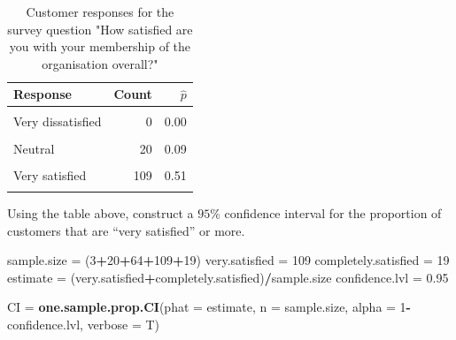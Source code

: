 \documentclass[
]{article}
\newenvironment{Shaded}{\begin{snugshade}}{\end{snugshade}}
\newcommand{\AttributeTok}[1]{\textcolor[rgb]{0.13,0.29,0.53}{#1}}
\newcommand{\DecValTok}[1]{\textcolor[rgb]{0.00,0.00,0.81}{#1}}
\newcommand{\FloatTok}[1]{\textcolor[rgb]{0.00,0.00,0.81}{#1}}
\newcommand{\FunctionTok}[1]{\textcolor[rgb]{0.13,0.29,0.53}{\textbf{#1}}}
\newcommand{\NormalTok}[1]{#1}
\newcommand{\OtherTok}[1]{\textcolor[rgb]{0.56,0.35,0.01}{#1}}
\newcommand{\SpecialCharTok}[1]{\textcolor[rgb]{0.81,0.36,0.00}{\textbf{#1}}}
\begin{document}
\begin{table}[H]
\centering\centering
\caption{\label{tab:unnamed-chunk-5}Customer responses for the survey question "How satisfied are you with your membership of the organisation overall?"}
\centering
\begin{tabular}[t]{lrr}
\toprule
Response & Count & $\hat{p}$\\
\midrule
\cellcolor{gray!10}{Completely dissatisfied} & \cellcolor{gray!10}{0} & \cellcolor{gray!10}{0.00}\\
Very dissatisfied & 0 & 0.00\\
\cellcolor{gray!10}{Dissatisfied} & \cellcolor{gray!10}{3} & \cellcolor{gray!10}{0.01}\\
Neutral & 20 & 0.09\\
\cellcolor{gray!10}{Satisfied} & \cellcolor{gray!10}{64} & \cellcolor{gray!10}{0.30}\\
\addlinespace
Very satisfied & 109 & 0.51\\
\cellcolor{gray!10}{Completely satisfied} & \cellcolor{gray!10}{19} & \cellcolor{gray!10}{0.09}\\
\bottomrule
\end{tabular}
\end{table}

Using the table above, construct a \(95\%\) confidence interval for the
proportion of customers that are ``very satisfied'' or more.

\begin{Shaded}
\begin{Highlighting}[]
\NormalTok{sample.size }\OtherTok{=}\NormalTok{ (}\DecValTok{3}\SpecialCharTok{+}\DecValTok{20}\SpecialCharTok{+}\DecValTok{64}\SpecialCharTok{+}\DecValTok{109}\SpecialCharTok{+}\DecValTok{19}\NormalTok{)}
\NormalTok{very.satisfied }\OtherTok{=} \DecValTok{109}
\NormalTok{completely.satisfied }\OtherTok{=} \DecValTok{19}
\NormalTok{estimate }\OtherTok{=}\NormalTok{ (very.satisfied}\SpecialCharTok{+}\NormalTok{completely.satisfied)}\SpecialCharTok{/}\NormalTok{sample.size}
\NormalTok{confidence.lvl }\OtherTok{=} \FloatTok{0.95}

\NormalTok{CI }\OtherTok{=} \FunctionTok{one.sample.prop.CI}\NormalTok{(}\AttributeTok{phat =}\NormalTok{ estimate, }
                        \AttributeTok{n =}\NormalTok{ sample.size, }
                        \AttributeTok{alpha =} \DecValTok{1}\SpecialCharTok{{-}}\NormalTok{confidence.lvl, }
                        \AttributeTok{verbose =}\NormalTok{ T)}
\end{Highlighting}
\end{Shaded}
\end{document}

